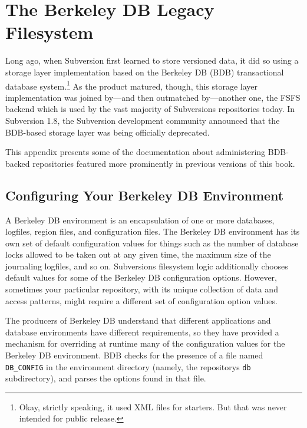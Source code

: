 \chapter{The Berkeley DB Legacy Filesystem}\label{svn.berkeleydb}

Long ago, when Subversion first learned to store versioned data, it did
so using a storage layer implementation based on the Berkeley DB (BDB)
transactional database system.\footnote{Okay, strictly speaking, it used
  XML files for starters. But that was never intended for public
  release.} As the product matured, though, this storage layer
implementation was joined by---and then outmatched by---another one, the
FSFS backend which is used by the vast majority of
Subversion\textquotesingle s repositories today. In Subversion 1.8, the
Subversion development community announced that the BDB-based storage
layer was being officially deprecated.

This appendix presents some of the documentation about administering
BDB-backed repositories featured more prominently in previous versions
of this book.

\section{Configuring Your Berkeley DB
Environment}\label{svn.berkeleydb.configuration}

A Berkeley DB environment is an encapsulation of one or more databases,
logfiles, region files, and configuration files. The Berkeley DB
environment has its own set of default configuration values for things
such as the number of database locks allowed to be taken out at any
given time, the maximum size of the journaling logfiles, and so on.
Subversion\textquotesingle s filesystem logic additionally chooses
default values for some of the Berkeley DB configuration options.
However, sometimes your particular repository, with its unique
collection of data and access patterns, might require a different set of
configuration option values.

The producers of Berkeley DB understand that different applications and
database environments have different requirements, so they have provided
a mechanism for overriding at runtime many of the configuration values
for the Berkeley DB environment. BDB checks for the presence of a file
named \texttt{DB\_CONFIG} in the environment directory (namely, the
repository\textquotesingle s \texttt{db} subdirectory), and parses the
options found in that file.

